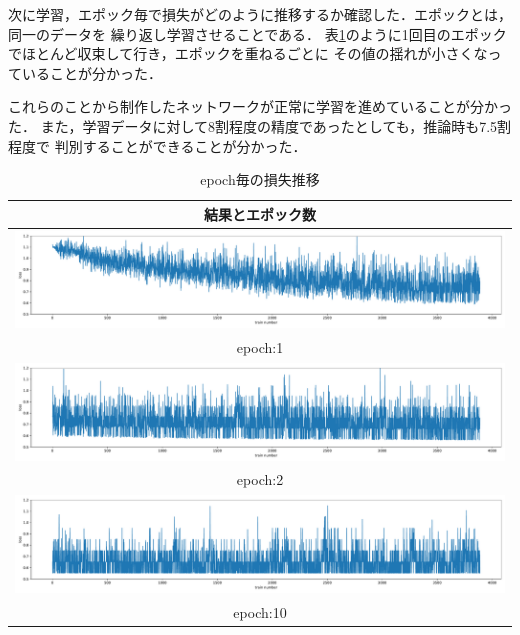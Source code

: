 次に学習，エポック毎で損失がどのように推移するか確認した．エポックとは，同一のデータを
繰り返し学習させることである．
表\ref{epoch}のように1回目のエポックでほとんど収束して行き，エポックを重ねるごとに
その値の揺れが小さくなっていることが分かった．

これらのことから制作したネットワークが正常に学習を進めていることが分かった．
また，学習データに対して8割程度の精度であったとしても，推論時も7.5割程度で
判別することができることが分かった．

\begin{table}[b]
  \begin{center}
    \begin{tabular}{|c|} \hline
      結果とエポック数 \\ \hline
        \includegraphics[width=130mm]{images/net_result/epoch_1.pdf} \\ epoch:1 \\ \hline
        \includegraphics[width=130mm]{images/net_result/epoch_2.pdf} \\ epoch:2 \\ \hline
        \includegraphics[width=130mm]{images/net_result/epoch_10.pdf} \\ epoch:10 \\ \hline
    \end{tabular}
  \end{center}
  \caption{epoch毎の損失推移}
  \label{epoch}
\end{table}
\clearpage